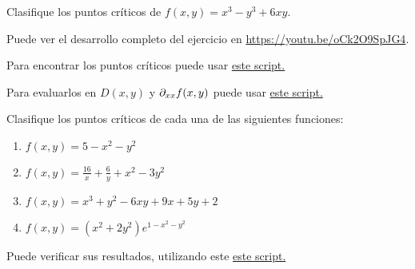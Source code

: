 \begin{problema}
	Clasifique los puntos cr\'iticos de $f(x,y)=x^3-y^3+6xy.$
	
\end{problema}

Puede ver el desarrollo completo del ejercicio en \href{hhttps://www.youtube.com/watch?v=oCk2O9SpJG4}{https://youtu.be/oCk2O9SpJG4}.

Para encontrar los puntos cr\'iticos puede usar \href{http://sagecell.sagemath.org/?z=eJyNkb1qwzAUhXeD3-FChsSpWgKBLsVT26Fr19LAjXJdLsiSK1nBepw-QKduXf1ivVZ-8NjBIEv6zjk6d_FEDVtuXQCDAY7oGfeGQlnIcrUcVFpWD2WxmF-DJlrN44-V_WcLFHqCDoODA-0JNLZ7Rj-_B53L_5-R5GPyCHREE9GXRbMaFKQKahh229u0297cr4d1EulHNDoaPHt26DWjAU-hI91PZjAIPgifqhqauwM3Ilb9ixT9JmUSrmia0FcKzhzp0gfpiJqdpSCUgS5a4bUfv3vWDi7mGwVntXpz6iTb2h6NLAIBt53nlv34NZ0YDj1OKcQqntQVZAfNXk0H2SdcjcKsaC1FK3At93kaKJ2aKenBWQFRHkuaQLLa8bcl78QbP9jKXB28lEV-3ertknwevd68K8jDKIuy-AMe8LWb&lang=sage}{este script.}

Para evaluarlos en $D(x,y)$ y $\partial_{xx}f(x,y)$ puede usar \href{http://sagecell.sagemath.org/?z=eJyNkU1uwjAQhfeRcoeRWBBTYFGkbqqsSiV6CaTBmVBLjp36B9m9U1c9AhfrEIhKu6BdWPbYM9-M35usqVVGddaDRg8HdAp3mnxZ8LGapnmeiseymFynQRuNVMdPw_fPBsgHgh69hYZ2BBK7nUJ3nQe9HeK3SLwUOQQ6oI7oyqKt0hyygBrSdrXI29XdwyzN8oCW1gSHl6YdBqfeYUPeKzRYFpu6Xb6eo0r8yveRhwnkOmWQx1xzkyzqzbAt-WUoeEItox75nvbRNMg_cVKhBke-JxlOv4LEc6Z0hkC7bFTLY4txLwuGvZg9V4wwaa1ryCDz0glgIqvkLPTRMFG640dQ0sKVDqm-v0XJ_6PkejFgut6pbrCLWH00ATXzSLPBmr1o-PStD9t3UdWe0vntZ4OyYJoJ1VlF8S_-n4re7DSKLb4A5KvnOw==&lang=sage}{este script.}





\begin{problema}
	Clasifique los puntos cr\'iticos de cada una de las siguientes funciones:
	\begin{enumerate}
		\item $f(x,y)=5-x^2-y^2$
		\item $f(x,y)=\frac{16}{x}+\frac{6}{y}+x^2-3y^2$
		\item $f(x,y)=x^3+y^2-6xy+9x+5y+2$
		\item $f(x,y)=(x^2+2y^{2})e^{1-x^2-y^2}$
	\end{enumerate}
	
\end{problema}

Puede verificar sus resultados, utilizando este \href{http://sagecell.sagemath.org/?z=eJyVVMGK2zAQvRv8D4NyWBu8ISz00l33slnIpaW0x9JdxrJMBYoUJDvYn9MP2FM_IT_WkWIr3iQLbUISWXrz3szoTRa14Aotbo0DhQ72aCVWSrg06YuhpMfshhY3-X2apMmiFo3U0oN1J1xrEZpOc3n4o8NhJYDjtpJoiQyO4HBKa78zgf0j8k7Y2gAq2FlDkltMkybrCxhyKOHDbf98dzs833ndnRVtO7zsrNRtxjwoYFgBx3VO6hwV71QsZIeWSwyFNH0AldAsa9lQRH7B2M8p-4mzGabtMXK4jBzmkUPM5rtRHZdGj_mA4B1OpVPBnW4NcHt4bSU3npPIgD0FkNHCXUGxM-kxzQIYia_YeWZjLrNjJV1bOqP2IvsxtaRcxaxp_bOA0P6Y0FSFcKTeGDumJDV4so9pAvR6IxsAvgGPp-ugUn4J5yRqAwO4DmrpuJVbqVG3Ik02ZbMcAdlJezOGnNcdDmDugc3U9fWxkOPzshbtjG4914R3ydcz3nX0QT-2KxrofSO9dVK00kLsUXVHN9AntMnFu3X3x7kR4ZCQxpIH-hLpNsrKe5kcFAgsAWuEjlpJM0QjaMjgWK7SpPJfsdxHmgHZSB5NdyHJLgfr6dxzcJKlfLBkBRYMKvqtLkpfZ0i7U-f8-tqYnTC-OSMqTWQzxjysrrmKZUGZ3lXBcgpmlM7XkCpV5qRS6B0uVOT5NPHQzqQU9_6N__Ph1f_VwTehsJV74xV8ZFCZOB_-l_N3f84plBNXi_5iwPl7E1QjmVlY717L8r-wl8z7&lang=sage}{este script.}


